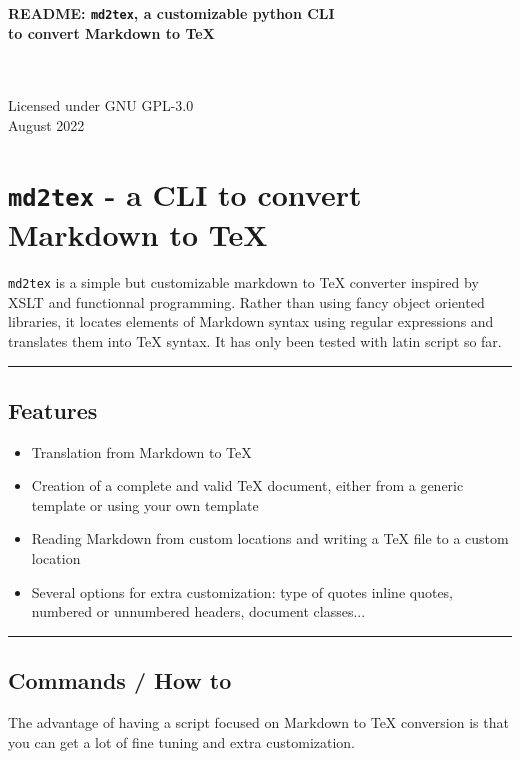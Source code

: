 \documentclass[a4paper, 12pt, twoside]{article}
\begin{document}
\begin{center}
	\begin{Large}
        \textbf{README: \texttt{md2tex}, a customizable python CLI \\ to convert Markdown to TeX}
    \end{Large}
    \bigskip
    \\~\\Licensed under GNU GPL-3.0\\August 2022
	\vspace{1.5cm}
\end{center}

\section{\texttt{md2tex} - a CLI to convert Markdown to TeX}

\texttt{md2tex} is a simple but customizable markdown to TeX converter inspired by XSLT and functionnal programming. 
Rather than using fancy object oriented libraries, it locates elements of Markdown syntax using regular 
expressions and translates them into TeX syntax. It has only been tested with latin script so far.

\par\noindent\rule{\linewidth}{0.4pt}
\subsection{Features}

\begin{itemize}
\item Translation from Markdown to TeX
\item Creation of a complete and valid TeX document, either from a generic template or using your own template
\item Reading Markdown from custom locations and writing a TeX file to a custom location
\item Several options for extra customization: type of quotes inline quotes, numbered or unnumbered headers, document classes... 
\end{itemize}

\par\noindent\rule{\linewidth}{0.4pt}
\subsection{Commands / How to}

The advantage of having a script focused on Markdown to TeX conversion is that you can get a lot of fine tuning
and extra customization.
\end{document}
